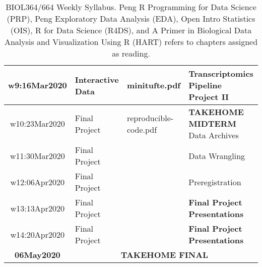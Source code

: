 \documentclass[11pt]{article} %
\begin{document}
\begin{table}[ht]
\begin{tabular}{| c | m{5cm} | m{3cm} | m{5.5cm} |}
	\hline
	w9:16Mar2020 & Interactive Data & minitufte.pdf & {\bf Transcriptomics Pipeline Project II}  \\ 
	\hline
	w10:23Mar2020 & Final Project & reproducible-code.pdf &  {\bf TAKEHOME MIDTERM} \newline Data Archives \\
	\hline
	w11:30Mar2020 & Final Project &  & Data Wrangling  \\
	\hline
	w12:06Apr2020 & Final Project &  & Preregistration  \newline {\bf Data Visualization Project} \\
	\hline
	w13:13Apr2020 & Final Project &  & {\bf Final Project Presentations} \\
	\hline 
	w14:20Apr2020 & Final Project & & {\bf Final Project Presentations}  \\ 
	\hline
	\hline
	\hline
	{\bf 06May2020}	  & \multicolumn{3}{c}{\bf TAKEHOME FINAL} \\
	\hline
	\hline
\end{tabular}
 
\caption{BIOL364/664 Weekly Syllabus. Peng R Programming for Data Science (PRP), Peng Exploratory Data Analysis (EDA), Open Intro Statistics (OIS), R for Data Science (R4DS),  and A Primer in Biological Data Analysis and Visualization Using R (HART) refers to chapters assigned as reading. }
\label{table:Syllabus} %
\end{table} 

\FloatBarrier

\end{document}

